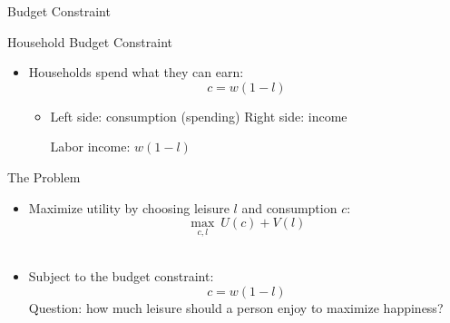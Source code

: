 \documentclass[10pt,aspectratio=169]{beamer}
\begin{document}
\begin{frame}{Budget Constraint}
\begin{center}
\end{center}
\end{frame}


\begin{frame}{Household Budget Constraint}
\begin{itemize}
\item Households spend what they can earn:
\[
c = w (1-l) 
\]
\vspace{-0.5cm}
\begin{itemize}
    \item Left side: consumption (spending)
    \itemvso Right side: income
    \begin{itemize}
        \itemvso Labor income: \(w (1-l)\)
    \end{itemize}
\end{itemize}
\end{itemize}

\end{frame}




\begin{frame}{The Problem}

\begin{itemize}
\item Maximize utility by choosing leisure \(l\) and consumption \(c\):
\[
\max_{c,l} \ U(c) + V(l)
\]\\
\vspace{-0.5cm}
\item Subject to the budget constraint:
\[
c = w (1-l)
\]
\itemvso Question: how much leisure should a person enjoy to maximize happiness?
\end{itemize}

\end{frame}
\end{document}
